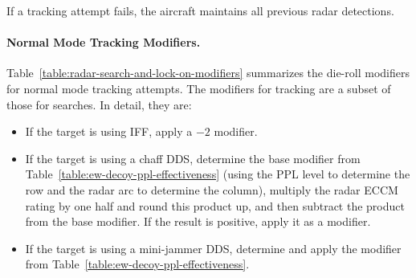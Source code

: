 {If a tracking attempt fails, the aircraft maintains all previous radar detections.


\paragraph{Normal Mode Tracking Modifiers.} Table~\ref{table:radar-search-and-lock-on-modifiers} summarizes the die-roll modifiers for normal mode tracking attempts. The modifiers for tracking are a subset of those for searches. In detail, they are:

\begin{itemize}
    \item If the target is using IFF, apply a $-2$ modifier.

    \item If the target is using a chaff DDS, determine the base modifier from Table~\ref{table:ew-decoy-ppl-effectiveness} (using the PPL level to determine the row and the radar arc to determine the column), multiply the radar ECCM rating by one half and round this product up, and then subtract the product from the base modifier. If the result is positive, apply it as a modifier.

    \item If the target is using a mini-jammer DDS, determine and apply the modifier from Table~\ref{table:ew-decoy-ppl-effectiveness}.

\end{itemize}

}
